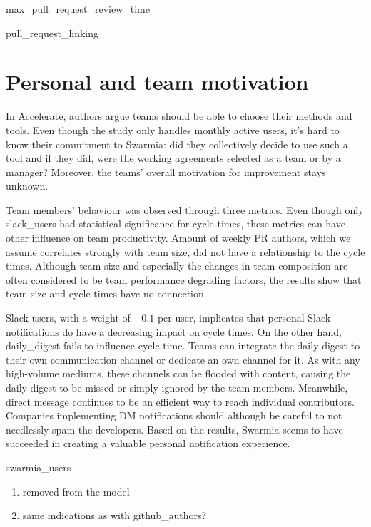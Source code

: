 
max\_pull\_request\_review\_time

pull\_request\_linking


\section{Personal and team motivation}

In Accelerate, authors argue teams should be able to choose their methods and tools. Even though the study only handles monthly active users, it's hard to know their commitment to Swarmia: did they collectively decide to use such a tool and if they did, were the working agreements selected as a team or by a manager? Moreover, the teams' overall motivation for improvement stays unknown. 

Team members' behaviour was observed through three metrics. Even though only slack\_users had statistical significance for cycle times, these metrics can have other influence on team productivity. Amount of weekly PR authors, which we assume correlates strongly with team size, did not have a relationship to the cycle times. Although team size and especially the changes in team composition are often considered to be team performance degrading factors, the results show that team size and cycle times have no connection. 

Slack users, with a weight of $-0.1$ per user, implicates that personal Slack notifications do have a decreasing impact on cycle times. On the other hand, daily\_digest fails to influence cycle time. Teams can integrate the daily digest to their own communication channel or dedicate an own channel for it. As with any high-volume mediums, these channels can be flooded with content, causing the daily digest to be missed or simply ignored by the team members. Meanwhile, direct message continues to be an efficient way to reach individual contributors. Companies implementing DM notifications should although be careful to not needlessly spam the developers. Based on the results, Swarmia seems to have succeeded in creating a valuable personal notification experience. 



swarmia\_users
\begin{enumerate}
    \item{removed from the model}
    \item{same indications as with github\_authors? }
\end{enumerate}

